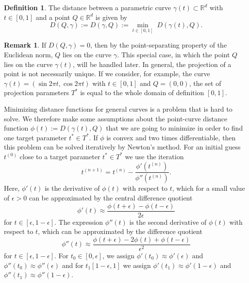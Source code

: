 \documentclass[a4paper, 11pt]{report}
\theoremstyle{definition}
\newtheorem{definition}{Definition}[section]
\newtheorem*{remark}{Remark}
\begin{document}
	\begin{definition}
		The distance between a parametric curve $\gamma(t) \subset \mathbb{R}^d$ with $t \in [0,1]$ and a point $Q \in \mathbb{R}^d$ is given by
			$$D(Q, \gamma) := D(\gamma, Q) := \underset{t \in [0,1]}{\min} \; D(\gamma(t), Q).$$
	\end{definition}

	\begin{remark}
		If $D(Q, \gamma) = 0$, then by the point-separating property of the Euclidean norm, $Q$ lies on the curve $\gamma$. This special case, in which the point $Q$ lies on the curve $\gamma(t)$, will be handled later. In general, the projection of a point is not necessarily unique. If we consider, for example, the curve $\gamma(t) = (\sin 2\pi t, \cos 2\pi t)$ with $t \in [0,1]$ and $Q = (0,0)$, the set of projection parameters $T^*$ is equal to the whole domain of definition $[0,1]$.
	\end{remark}

	Minimizing distance functions for general curves is a problem that is hard to solve. We therefore make some assumptions about the point-curve distance function $\phi(t) := D(\gamma(t), Q)$ that we are going to minimize in order to find one target parameter $t^* \in T^*$. If $\phi$ is convex and two times differentiable, then this problem can be solved iteratively by Newton's method. For an initial guess $t^{(0)}$ close to a target parameter $t^* \in T^*$ we use the iteration
		$$ t^{(n+1)} = t^{(n)} - \frac {\phi'(t^{(n)})}{\phi''(t^{(n)})}. $$
	Here, $\phi'(t)$ is the derivative of $\phi(t)$ with respect to $t$, which for a small value of $\epsilon > 0$ can be approximated by the central difference quotient
		\begin{equation}
			\phi'(t) \approx \frac{\phi(t+\epsilon) - \phi(t-\epsilon)}{2\epsilon}
		\end{equation}
	for $t \in [\epsilon, 1-\epsilon]$. The expression $\phi''(t)$ is the second derivative of $\phi(t)$ with respect to $t$, which can be approximated by the difference quotient
		\begin{equation}
			\phi''(t) \approx \frac{\phi(t+\epsilon) - 2\phi(t) + \phi(t-\epsilon)}{\epsilon^2}
		\end{equation}
	for $t \in [\epsilon, 1-\epsilon]$. For $t_0 \in [0,\epsilon]$, we assign $\phi'(t_0) \approx \phi'(\epsilon)$ and $\phi''(t_0) \approx \phi''(\epsilon)$ and for $t_1 [1-\epsilon,1]$ we assign $\phi'(t_1) \approx \phi'(1-\epsilon)$ and $\phi''(t_1) \approx \phi''(1-\epsilon)$.
\end{document}
